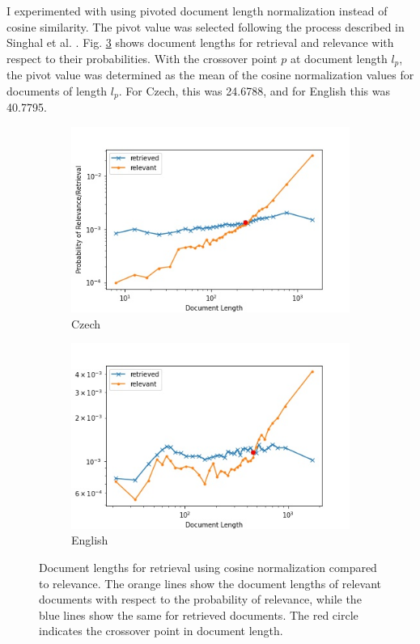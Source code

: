 \documentclass[a4paper]{article}
\begin{document}
I experimented with using pivoted document length normalization instead of
cosine similarity. The pivot value was selected following the process described
in Singhal et al. \cite{singhal}. Fig. \ref{fig:cosine} shows document lengths
for retrieval and relevance with respect to their probabilities. With the
crossover point $p$ at document length $l_p$, the pivot value was determined as
the mean of the cosine normalization values for documents of length $l_p$. For
Czech, this was 24.6788, and for English this was 40.7795. 

\begin{figure}[htpb]
	\centering
	\begin{subfigure}{0.45\textwidth}
		\includegraphics[width=\textwidth]{plot_cs_rel_ret.jpg}
		\caption{Czech}
		\label{fig:cs_cosine}
	\end{subfigure}
	\hfill
	\begin{subfigure}{0.45\textwidth}
		\includegraphics[width=\textwidth]{plot_en_rel_ret.jpg}
		\caption{English}
		\label{fig:en_cosine}
	\end{subfigure}
	\caption{Document lengths for retrieval using cosine normalization compared
	to relevance. The orange lines show the document lengths of relevant documents
	with respect to the probability of relevance, while the blue lines show the
	same for retrieved documents. The red circle indicates the crossover point
	in document length.}
	\label{fig:cosine}
\end{figure}
\end{document}
